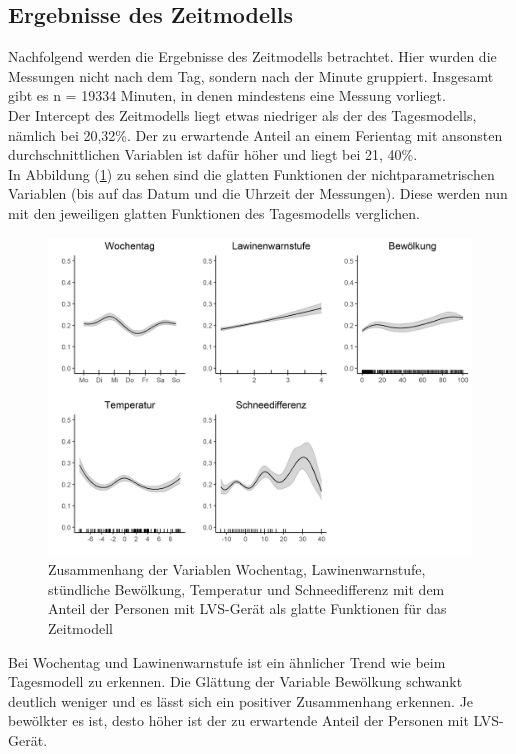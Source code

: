 \documentclass[12pt]{scrreprt}
\begin{document}
\subsection{Ergebnisse des Zeitmodells}
Nachfolgend werden die Ergebnisse des Zeitmodells betrachtet. Hier wurden die Messungen nicht nach dem Tag, sondern nach der Minute gruppiert. Insgesamt gibt es n = 19334 Minuten, in denen mindestens eine Messung vorliegt. \\
Der Intercept des Zeitmodells liegt etwas niedriger als der des Tagesmodells, nämlich bei 20,32\%. Der zu erwartende Anteil an einem Ferientag mit ansonsten durchschnittlichen Variablen ist dafür höher und liegt bei 21, 40\%. \\
In Abbildung (\ref{pic:smooth_time_model}) zu sehen sind die glatten Funktionen der nichtparametrischen Variablen (bis auf das Datum und die Uhrzeit der Messungen). Diese werden nun mit den jeweiligen glatten Funktionen des Tagesmodells verglichen.
\begin{figure}[H]
	\centering
	\includegraphics[width=\linewidth]{plots/smooth_time_model}
	\caption{Zusammenhang der Variablen Wochentag, Lawinenwarnstufe, stündliche Bewölkung, Temperatur und Schneedifferenz mit dem Anteil der Personen mit LVS-Gerät als glatte Funktionen für das Zeitmodell}
	\label{pic:smooth_time_model}	
\end{figure}
\noindent Bei Wochentag und Lawinenwarnstufe ist ein ähnlicher Trend wie beim Tagesmodell zu erkennen. Die Glättung der Variable Bewölkung schwankt deutlich weniger und es lässt sich ein positiver Zusammenhang erkennen. Je bewölkter es ist, desto höher ist der zu erwartende Anteil der Personen mit LVS-Gerät. \\
\end{document}
